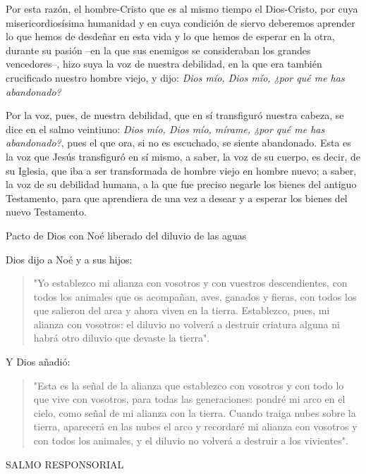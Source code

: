 \begin{readbody}Por esta razón, el hombre-Cristo que es al mismo tiempo el Dios-Cristo, por cuya misericordiosísima humanidad y en cuya condición de siervo deberemos aprender lo que hemos de desdeñar en esta vida y lo que hemos de esperar en la otra, durante su pasión –en la que sus enemigos se consideraban los grandes vencedores–, hizo suya la voz de nuestra debilidad, en la que era también crucificado nuestro hombre viejo, y dijo: \textit{Dios mío, Dios mío, ¿por qué me has abandonado?}\end{readbody}

\begin{readbody}Por la voz, pues, de nuestra debilidad, que en sí transfiguró nuestra cabeza, se dice en el salmo veintiuno: \textit{Dios mío, Dios mío, mírame, ¿por qué me has abandonado?}, pues el que ora, si no es escuchado, se siente abandonado. Esta es la voz que Jesús transfiguró en sí mismo, a saber, la voz de su cuerpo, es decir, de su Iglesia, que iba a ser transformada de hombre viejo en hombre nuevo; a saber, la voz de su debilidad humana, a la que fue preciso negarle los bienes del antiguo Testamento, para que aprendiera de una vez a desear y a esperar los bienes del nuevo Testamento.\end{readbody}


\begin{readtheme}Pacto de Dios con Noé liberado del diluvio de las aguas\end{readtheme}

\begin{readbody}Dios dijo a Noé y a sus hijos:

\begin{verse}"Yo establezco mi alianza con vosotros y con vuestros descendientes, con todos los animales que os acompañan, aves, ganados y fieras, con todos los que salieron del arca y ahora viven en la tierra. Establezco, pues, mi alianza con vosotros: el diluvio no volverá a destruir criatura alguna ni habrá otro diluvio que devaste la tierra".\end{verse}

Y Dios añadió:

\begin{verse}"Esta es la señal de la alianza que establezco con vosotros y con todo lo que vive con vosotros, para todas las generaciones: pondré mi arco en el cielo, como señal de mi alianza con la tierra. Cuando traiga nubes sobre la tierra, aparecerá en las nubes el arco y recordaré mi alianza con vosotros y con todos los animales, y el diluvio no volverá a destruir a los vivientes".\end{verse}
\end{readbody}
\begin{readtitle}SALMO RESPONSORIAL\end{readtitle}

